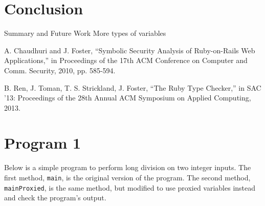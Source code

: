 \documentclass[10pt]{article}
\begin{document}
\section{Conclusion}
Summary and Future Work
More types of variables

\begin{thebibliography}{99}
A. Chaudhuri and J. Foster, ``Symbolic Security Analysis of Ruby-on-Rails Web Applications,'' in Proceedings of the 17th ACM Conference on Computer and Comm. Security, 2010, pp. 585-594.

B. Ren, J. Toman, T. S. Strickland, J. Foster, ``The Ruby Type Checker,'' in SAC '13: Proceedings of the 28th Annual ACM Symposium on Applied Computing, 2013.

\end{thebibliography}

\appendix

\section{Program 1}
Below is a simple program to perform long division on two integer inputs.  The first method, \texttt{main}, is the original version of the program.  The second method, \texttt{mainProxied}, is the same method, but modified to use proxied variables instead and check the program's output.\\
\end{document}
